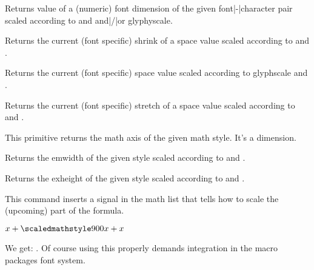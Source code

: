 \startnewprimitive[title={\prm {scaledfontdimen}}]

Returns value of a (numeric) font dimension of the given font|-|character pair
scaled according to  and  and|/|or \prm
{glyphyscale}.

\stopnewprimitive

\startnewprimitive[title={\prm {scaledinterwordshrink}}]

Returns the current (font specific) shrink of a space value scaled according to
 and .

\stopnewprimitive

\startnewprimitive[title={\prm {scaledinterwordspace}}]

Returns the current (font specific) space value scaled according to \prm
{glyphscale} and .

\stopnewprimitive

\startnewprimitive[title={\prm {scaledinterwordstretch}}]

Returns the current (font specific) stretch of a space value scaled according to
 and .

\stopnewprimitive

\startnewprimitive[title={\prm {scaledmathaxis}}]

This primitive returns the math axis of the given math style. It's a dimension.

\stopnewprimitive

\startnewprimitive[title={\prm {scaledmathemwidth}}]

Returns the emwidth of the given style scaled according to  and
.

\stopnewprimitive

\startnewprimitive[title={\prm {scaledmathexheight}}]

Returns the exheight of the given style scaled according to  and
.

\stopnewprimitive

\startnewprimitive[title={\prm {scaledmathstyle}}]

This command inserts a signal in the math list that tells how to scale the (upcoming)
part of the formula.

\startbuffer
$ x + {\scaledmathstyle900 x} + x$
\stopbuffer

\typebuffer

We get: \inlinebuffer. Of course using this properly demands integration in the macro
packages font system.

